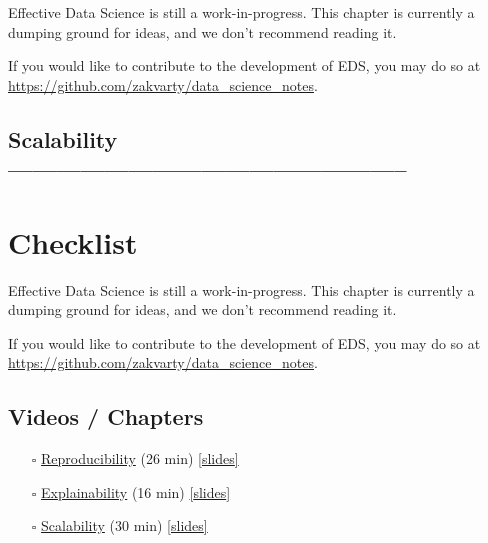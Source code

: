 \documentclass[
  12pt,
]{book}
\begin{document}
Effective Data Science is still a work-in-progress. This chapter is currently a dumping ground for ideas, and we don't recommend reading it.

If you would like to contribute to the development of EDS, you may do so at \url{https://github.com/zakvarty/data_science_notes}.

\hypertarget{scalability}{%
\section{Scalability --------------------------------------------------}\label{scalability}}

\hypertarget{production-checklist}{%
\chapter*{Checklist}\label{production-checklist}}

Effective Data Science is still a work-in-progress. This chapter is currently a dumping ground for ideas, and we don't recommend reading it.

If you would like to contribute to the development of EDS, you may do so at \url{https://github.com/zakvarty/data_science_notes}.

\hypertarget{videos-chapters-3}{%
\section{Videos / Chapters}\label{videos-chapters-3}}

\begin{itemize}
\item[$\square$]
  \href{https://imperial.cloud.panopto.eu/Panopto/Pages/Viewer.aspx?id=f48d43b4-b370-4cfb-a438-af9e00bf79b5}{Reproducibility} (26 min) \href{https://github.com/zakvarty/effective-data-science-slides-2022/raw/main/04-01-reproducibility/04-01-reproducibility.pdf}{{[}slides{]}}
\item[$\square$]
  \href{https://imperial.cloud.panopto.eu/Panopto/Pages/Viewer.aspx?id=f2c64757-faea-470f-9dfc-af9e00ba4929}{Explainability} (16 min) \href{https://github.com/zakvarty/effective-data-science-slides-2022/raw/main/04-02-explainability/04-02-explainability.pdf}{{[}slides{]}}
\item[$\square$]
  \href{https://imperial.cloud.panopto.eu/Panopto/Pages/Viewer.aspx?id=5305fbb1-8dc9-4232-82d0-afa00187f942}{Scalability} (30 min) \href{https://github.com/zakvarty/effective-data-science-slides-2022/raw/main/04-03-scalability/04-03-scalability.pdf}{{[}slides{]}}
\end{itemize}
\end{document}
